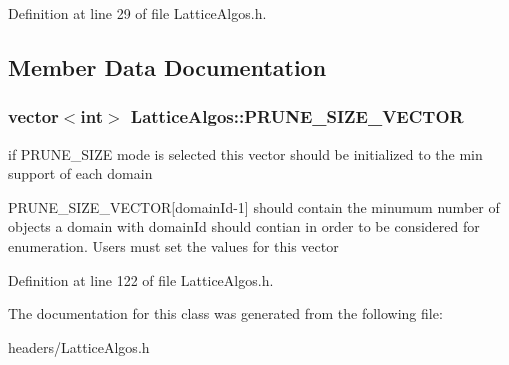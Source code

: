 Definition at line 29 of file LatticeAlgos.h.



\subsection{Member Data Documentation}
\hypertarget{class_lattice_algos_a244d9a63307846c2df232091a78a6759}{
\subsubsection[{PRUNE\_\-SIZE\_\-VECTOR}]{\setlength{\rightskip}{0pt plus 5cm}vector$<$int$>$ {\bf LatticeAlgos::PRUNE\_\-SIZE\_\-VECTOR}}}
\label{class_lattice_algos_a244d9a63307846c2df232091a78a6759}


if PRUNE\_\-SIZE mode is selected this vector should be initialized to the min support of each domain 

PRUNE\_\-SIZE\_\-VECTOR\mbox{[}domainId-\/1\mbox{]} should contain the minumum number of objects a domain with domainId should contian in order to be considered for enumeration. Users must set the values for this vector 

Definition at line 122 of file LatticeAlgos.h.



The documentation for this class was generated from the following file:\begin{DoxyCompactItemize}
\item 
headers/LatticeAlgos.h\end{DoxyCompactItemize}
